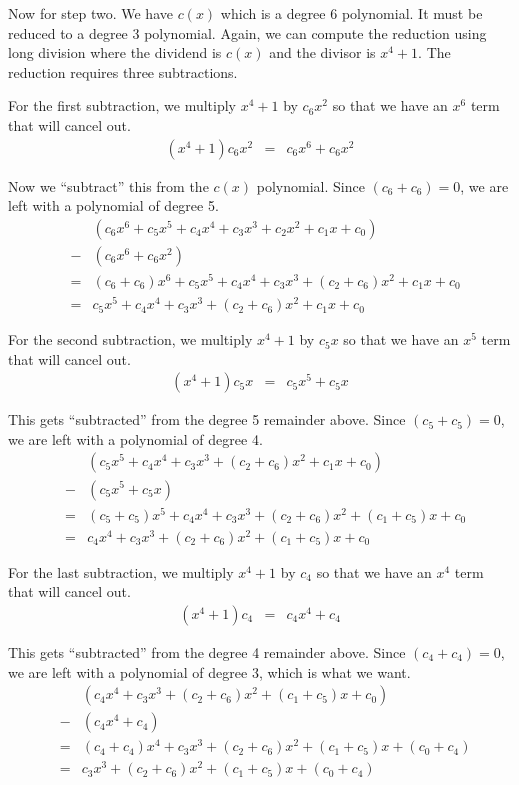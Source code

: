 \documentclass{article}
\begin{document}
Now for step two.
We have $c(x)$ which is a degree 6 polynomial.
It must be reduced to a degree 3 polynomial.
Again, we can compute the reduction using long division
where the dividend is $c(x)$ and the divisor is $x^4 + 1$.
The reduction requires three subtractions.

For the first subtraction, we multiply $x^4 + 1$ by $c_6 x^2$
so that we have an $x^6$ term that will cancel out.
\begin{eqnarray*}
  (x^4 + 1) c_6 x^2 &=& c_6 x^6 + c_6 x^2
\end{eqnarray*}

Now we ``subtract'' this from the $c(x)$ polynomial.
Since $(c_6 + c_6)=0$, we are left with a polynomial of degree 5.
\begin{eqnarray*}
  & & (c_6 x^6 + c_5 x^5 + c_4 x^4 + c_3 x^3 + c_2 x^2 + c_1 x + c_0) \\
  &-& (c_6 x^6 + c_6 x^2) \\
  &=& (c_6 + c_6) x^6 + c_5 x^5 + c_4 x^4 + c_3 x^3 + (c_2 + c_6) x^2 + c_1 x + c_0 \\
  &=& c_5 x^5 + c_4 x^4 + c_3 x^3 + (c_2 + c_6) x^2 + c_1 x + c_0
\end{eqnarray*}

For the second subtraction, we multiply $x^4 + 1$ by $c_5 x$
so that we have an $x^5$ term that will cancel out.
\begin{eqnarray*}
  (x^4 + 1) c_5 x &=& c_5 x^5 + c_5 x
\end{eqnarray*}

This gets ``subtracted'' from the degree 5 remainder above.
Since $(c_5 + c_5)=0$, we are left with a polynomial of degree 4.
\begin{eqnarray*}
  & & (c_5 x^5 + c_4 x^4 + c_3 x^3 + (c_2 + c_6) x^2 + c_1 x + c_0) \\
  &-& (c_5 x^5 + c_5 x) \\
  &=& (c_5 + c_5) x^5 + c_4 x^4 + c_3 x^3 + (c_2 + c_6) x^2 + (c_1 + c_5) x + c_0 \\
  &=& c_4 x^4 + c_3 x^3 + (c_2 + c_6) x^2 + (c_1 + c_5) x + c_0
\end{eqnarray*}

For the last subtraction, we multiply $x^4 + 1$ by $c_4$
so that we have an $x^4$ term that will cancel out.
\begin{eqnarray*}
  (x^4 + 1) c_4 &=& c_4 x^4 + c_4
\end{eqnarray*}

This gets ``subtracted'' from the degree 4 remainder above.
Since $(c_4 + c_4)=0$, we are left with a polynomial of degree 3,
which is what we want.
\begin{eqnarray*}
  & & (c_4 x^4 + c_3 x^3 + (c_2 + c_6) x^2 + (c_1 + c_5) x + c_0) \\
  &-& (c_4 x^4 + c_4) \\
  &=& (c_4 + c_4) x^4 + c_3 x^3 + (c_2 + c_6) x^2 + (c_1 + c_5) x + (c_0 + c_4) \\
  &=& c_3 x^3 + (c_2 + c_6) x^2 + (c_1 + c_5) x + (c_0 + c_4)
\end{eqnarray*}
\end{document}
